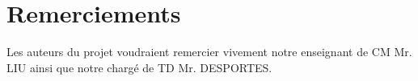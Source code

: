\documentclass[11pt, french]{article}
\begin{document}


\tableofcontents
\listoffigures
\listoftables


\newpage
\section* {Remerciements}
Les auteurs du projet voudraient remercier vivement notre enseignant de CM Mr. LIU ainsi que notre chargé de TD Mr. DESPORTES.







\end{document}
